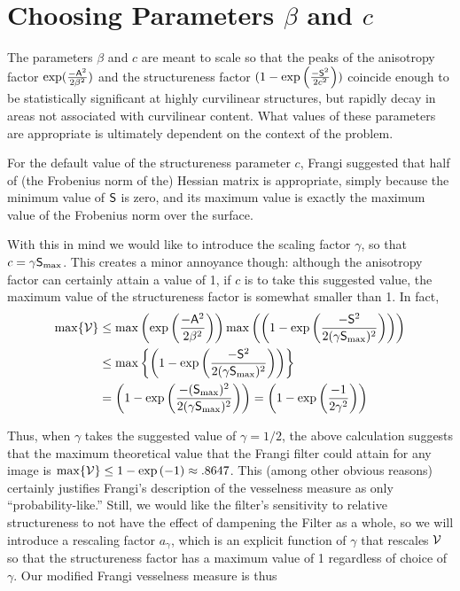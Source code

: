 \section{Choosing Parameters $\beta$ and $c$}

The parameters $\beta$ and $c$ are meant to scale so that the peaks of the anisotropy factor $\exp(\frac{-\mathsf{A}^2}{2\beta^2})$ and the structureness factor $(1-\exp\left(\frac{-\mathsf{S}^2}{2c^2}\right))$ coincide enough to be statistically significant at highly curvilinear structures, but rapidly decay in areas not associated with curvilinear content. What values of these parameters are appropriate is ultimately dependent on the context of the problem.

For the default value of the structureness parameter $c$, Frangi suggested that half of (the Frobenius norm of the) Hessian matrix is appropriate, simply because the minimum value of $\mathsf{S}$ is zero, and its maximum value is exactly the maximum value of the Frobenius norm over the surface.

With this in mind we would like to introduce the scaling factor $\gamma$, so that $ c = \gamma \mathsf{S}_{\max}$. This creates a minor annoyance though: although the anisotropy factor can certainly attain a value of 1, if $c$ is to take this suggested value, the maximum value of the structureness factor is somewhat smaller than 1. In fact,
\begin{equation}
\begin{aligned}
\max\{\mathcal{V} \} &\le \max\left(
\exp\left(\frac{-\mathsf{A}^2}{2\beta^2}\right)
\right)
\max\left(
\left(1 - \exp\left(\frac{-\mathsf{S}^2}{2(\gamma \mathsf{S}_{\max})^2}\right)\right)
\right) \\
&\le \max\left\{
\left(1 - \exp\left(\frac{-\mathsf{S}^2}{2(\gamma \mathsf{S}_{\max})^2}\right)\right)
\right\} \\
&= 
\left(1 - \exp\left(\frac{-(\mathsf{S}_{\max})^2}{2(\gamma \mathsf{S}_{\max})^2}\right)
\right)
= \left(1 - \exp\left(\frac{-1}{2\gamma^2}\right)
\right)
\end{aligned}
\end{equation}

Thus, when $\gamma$ takes the suggested value of $\gamma = 1/2$, the above calculation suggests that
the maximum theoretical value that the Frangi filter could attain for any image is
$ \max \{ \mathcal{V} \} \le 1 - \exp\left( -1 \right) \approx .8647$.
This (among other obvious reasons) certainly justifies Frangi's description of the vesselness measure as only ``probability-like.'' Still, we would like the filter's sensitivity to relative structureness to not have the effect of dampening the Filter as a whole, so we will introduce a rescaling factor $a_\gamma$, which is an explicit function of $\gamma$ that rescales $\mathcal{V}$ so that the structureness factor has a maximum value of 1 regardless of choice of $\gamma$. Our modified Frangi vesselness measure is thus

